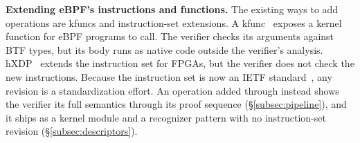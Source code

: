 \noindent\textbf{Extending eBPF's instructions and functions.}
The existing ways to add operations are kfuncs and instruction-set extensions.
A kfunc~\cite{kfuncs} exposes a kernel function for eBPF programs to call. The verifier checks its arguments against BTF types, but its body runs as native code outside the verifier's analysis.
hXDP~\cite{brunella2020hxdp} extends the instruction set for FPGAs, but the verifier does not check the new instructions.
Because the instruction set is now an IETF standard~\cite{rfc9669}, any revision is a standardization effort.
An operation added through \tool instead shows the verifier its full semantics through its proof sequence (\S\ref{subsec:pipeline}), and it ships as a kernel module and a recognizer pattern with no instruction-set revision (\S\ref{subsec:descriptors}).

